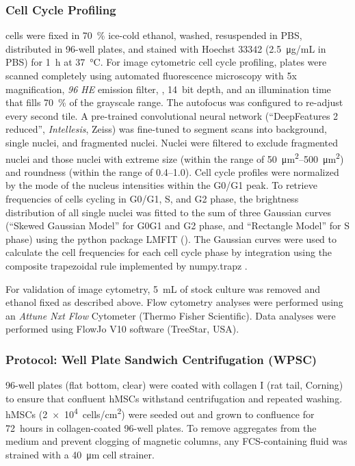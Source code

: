\subsubsection*{Cell Cycle Profiling}
\INA cells were fixed in \SI{70}{\percent} ice-cold ethanol, washed,
resuspended in PBS, distributed in 96-well plates, and stained with Hoechst
33342 (\SI{2.5}{\micro\gram/mL} in PBS) for \SI{1}{\hour} at
\SI{37}{\degreeCelsius}. For image cytometric cell cycle profiling, plates were
scanned completely using automated fluorescence microscopy with
5x magnification, \textit{96 HE} emission filter, , \SI{14}{bit}
depth, and an illumination time that fills \SI{70}{\percent} of the grayscale
range. The autofocus was configured to re-adjust every second tile. A
pre-trained convolutional neural network (“DeepFeatures 2 reduced”,  \textit{Intellesis},
Zeiss) was fine-tuned to segment scans into background, single nuclei, and
fragmented nuclei. Nuclei were filtered to exclude fragmented nuclei and those
nuclei with extreme size (within the range of
\SIrange{50}{500}{\micro\meter\squared}) and roundness (within the range of
\numrange{0.4}{1.0}). Cell cycle profiles were normalized by the mode of the
nucleus intensities within the G0/G1 peak. To retrieve frequencies of cells
cycling in G0/G1, S, and G2 phase, the brightness distribution of all single
nuclei was fitted to the sum of three Gaussian curves (“Skewed Gaussian Model”
for G0G1 and G2 phase, and “Rectangle Model” for S phase) using the python
package LMFIT \cite{newvilleLMFITNonLinearLeastSquare2014} ().
The Gaussian curves were used to calculate the cell frequencies for each cell
cycle phase by integration using the composite trapezoidal rule implemented by
numpy.trapz \cite{harrisArrayProgrammingNumPy2020}.

For validation of image cytometry, \SI{5}{mL} of \INA stock culture was removed
and ethanol fixed as described above. Flow cytometry analyses were performed
using an \textit{Attune Nxt Flow} Cytometer (Thermo Fisher Scientific). Data analyses
were performed using FlowJo V10 software (TreeStar, USA).


\subsubsection*{Protocol: Well Plate Sandwich Centrifugation (WPSC)}
96-well plates (flat bottom, clear) were coated with collagen I (rat tail,
Corning) to ensure that confluent hMSCs withstand centrifugation and
repeated washing. hMSCs (\SI{2e4}{cells/cm^2}) were seeded out and grown to
confluence for \SI{72}{hours} in collagen-coated 96-well plates. To remove
aggregates from the medium and prevent clogging of magnetic columns, any
FCS-containing fluid was strained with a \SI{40}{\micro\meter} cell
strainer.

